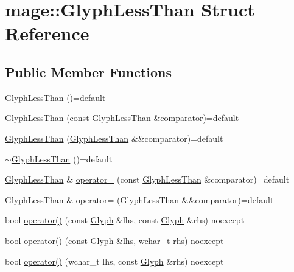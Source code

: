 \hypertarget{structmage_1_1_glyph_less_than}{}\section{mage\+:\+:Glyph\+Less\+Than Struct Reference}
\label{structmage_1_1_glyph_less_than}
\subsection*{Public Member Functions}
\begin{DoxyCompactItemize}
\item 
\hyperlink{structmage_1_1_glyph_less_than_a2ad76294131749c19d83b6f92c74f1dc}{Glyph\+Less\+Than} ()=default
\item 
\hyperlink{structmage_1_1_glyph_less_than_a27fc34d9db41ebba7a7b40864837e7e7}{Glyph\+Less\+Than} (const \hyperlink{structmage_1_1_glyph_less_than}{Glyph\+Less\+Than} \&comparator)=default
\item 
\hyperlink{structmage_1_1_glyph_less_than_ae41c3b9b7ecf202b5518f911342e170c}{Glyph\+Less\+Than} (\hyperlink{structmage_1_1_glyph_less_than}{Glyph\+Less\+Than} \&\&comparator)=default
\item 
\hyperlink{structmage_1_1_glyph_less_than_ace50804a419a31b0413566b5aba2eeac}{$\sim$\+Glyph\+Less\+Than} ()=default
\item 
\hyperlink{structmage_1_1_glyph_less_than}{Glyph\+Less\+Than} \& \hyperlink{structmage_1_1_glyph_less_than_aa3de6a126c3a70ad452a17b37709eca6}{operator=} (const \hyperlink{structmage_1_1_glyph_less_than}{Glyph\+Less\+Than} \&comparator)=default
\item 
\hyperlink{structmage_1_1_glyph_less_than}{Glyph\+Less\+Than} \& \hyperlink{structmage_1_1_glyph_less_than_aeee354f70d70e708e7478066c38166b2}{operator=} (\hyperlink{structmage_1_1_glyph_less_than}{Glyph\+Less\+Than} \&\&comparator)=default
\item 
bool \hyperlink{structmage_1_1_glyph_less_than_a7a8b5bb8d25f49790105ffee80cf2f71}{operator()} (const \hyperlink{structmage_1_1_glyph}{Glyph} \&lhs, const \hyperlink{structmage_1_1_glyph}{Glyph} \&rhs) noexcept
\item 
bool \hyperlink{structmage_1_1_glyph_less_than_a0ae04e2104bafaa37e951409a126a44f}{operator()} (const \hyperlink{structmage_1_1_glyph}{Glyph} \&lhs, wchar\+\_\+t rhs) noexcept
\item 
bool \hyperlink{structmage_1_1_glyph_less_than_a24f8a3b7cf190212a226fcf4900f558a}{operator()} (wchar\+\_\+t lhs, const \hyperlink{structmage_1_1_glyph}{Glyph} \&rhs) noexcept
\end{DoxyCompactItemize}


